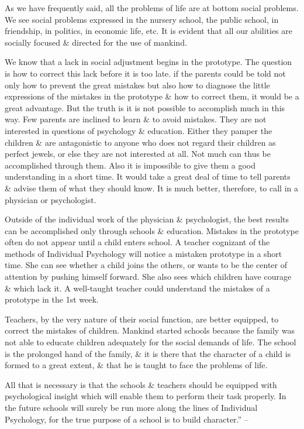 \documentclass{article}
\begin{document}
As we have frequently said, all the problems of life are at bottom social problems. We see social problems expressed in the nursery school, the public school, in friendship, in politics, in economic life, etc. It is evident that all our abilities are socially focused \& directed for the use of mankind.

We know that a lack in social adjustment begins in the prototype. The question is how to correct this lack before it is too late. if the parents could be told not only how to prevent the great mistakes but also how to diagnose the little expressions of the mistakes in the prototype \& how to correct them, it would be a great advantage. But the truth is it is not possible to accomplish much in this way. Few parents are inclined to learn \& to avoid mistakes. They are not interested in questions of psychology \& education. Either they pamper the children \& are antagonistic to anyone who does not regard their children as perfect jewels, or else they are not interested at all. Not much can thus be accomplished through them. Also it is impossible to give them a good understanding in a short time. It would take a great deal of time to tell parents \& advise them of what they should know. It is much better, therefore, to call in a physician or psychologist.

Outside of the individual work of the physician \& psychologist, the best results can be accomplished only through schools \& education. Mistakes in the prototype often do not appear until a child enters school. A teacher cognizant of the methods of Individual Psychology will notice a mistaken prototype in a short time. She can see whether a child joins the others, or wants to be the center of attention by pushing himself forward. She also sees which children have courage \& which lack it. A well-taught teacher could understand the mistakes of a prototype in the 1st week.

Teachers, by the very nature of their social function, are better equipped, to correct the mistakes of children. Mankind started schools because the family was not able to educate children adequately for the social demands of life. The school is the prolonged hand of the family, \& it is there that the character of a child is formed to a great extent, \& that he is taught to face the problems of life.

All that is necessary is that the schools \& teachers should be equipped with psychological insight which will enable them to perform their task properly. In the future schools will surely be run more along the lines of Individual Psychology, for the true purpose of a school is to build character.'' -- \cite[pp. 199--214]{Adler_science_living}
\end{document}
